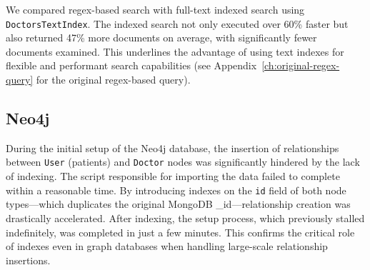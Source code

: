 We compared regex-based search with full-text indexed search using \texttt{DoctorsTextIndex}. The indexed search not only executed over 60\% faster but also returned 47\% more documents on average, with significantly fewer documents examined. This underlines the advantage of using text indexes for flexible and performant search capabilities (see Appendix~\ref{ch:original-regex-query} for the original regex-based query).

\subsection{Neo4j}
During the initial setup of the Neo4j database, the insertion of relationships between \texttt{User} (patients) and \texttt{Doctor} nodes was significantly hindered by the lack of indexing. The script responsible for importing the data failed to complete within a reasonable time. By introducing indexes on the \texttt{id} field of both node types—which duplicates the original MongoDB \_id—relationship creation was drastically accelerated. After indexing, the setup process, which previously stalled indefinitely, was completed in just a few minutes. This confirms the critical role of indexes even in graph databases when handling large-scale relationship insertions.
